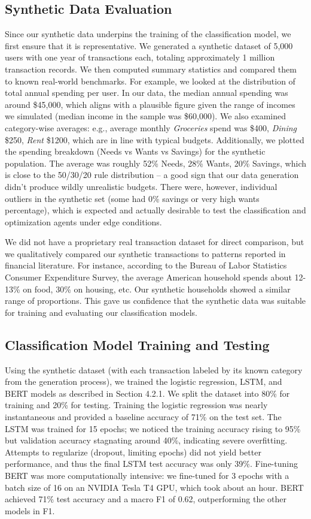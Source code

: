 \documentclass{scrartcl}
\begin{document}
\subsection{Synthetic Data Evaluation}
Since our synthetic data underpins the training of the classification model, we first ensure that it is representative. We generated a synthetic dataset of 5,000 users with one year of transactions each, totaling approximately 1 million transaction records. We then computed summary statistics and compared them to known real-world benchmarks. For example, we looked at the distribution of total annual spending per user. In our data, the median annual spending was around \$45,000, which aligns with a plausible figure given the range of incomes we simulated (median income in the sample was \$60,000). We also examined category-wise averages: e.g., average monthly \textit{Groceries} spend was \$400, \textit{Dining} \$250, \textit{Rent} \$1200, which are in line with typical budgets. Additionally, we plotted the spending breakdown (Needs vs Wants vs Savings) for the synthetic population. The average was roughly 52\% Needs, 28\% Wants, 20\% Savings, which is close to the 50/30/20 rule distribution – a good sign that our data generation didn't produce wildly unrealistic budgets. There were, however, individual outliers in the synthetic set (some had 0\% savings or very high wants percentage), which is expected and actually desirable to test the classification and optimization agents under edge conditions.

We did not have a proprietary real transaction dataset for direct comparison, but we qualitatively compared our synthetic transactions to patterns reported in financial literature. For instance, according to the Bureau of Labor Statistics Consumer Expenditure Survey, the average American household spends about 12-13\% on food, 30\% on housing, etc. Our synthetic households showed a similar range of proportions. This gave us confidence that the synthetic data was suitable for training and evaluating our classification models.

\subsection{Classification Model Training and Testing}
Using the synthetic dataset (with each transaction labeled by its known category from the generation process), we trained the logistic regression, LSTM, and BERT models as described in Section 4.2.1. We split the dataset into 80\% for training and 20\% for testing. Training the logistic regression was nearly instantaneous and provided a baseline accuracy of 71\% on the test set. The LSTM was trained for 15 epochs; we noticed the training accuracy rising to 95\% but validation accuracy stagnating around 40\%, indicating severe overfitting. Attempts to regularize (dropout, limiting epochs) did not yield better performance, and thus the final LSTM test accuracy was only 39\%. Fine-tuning BERT was more computationally intensive: we fine-tuned for 3 epochs with a batch size of 16 on an NVIDIA Tesla T4 GPU, which took about an hour. BERT achieved 71\% test accuracy and a macro F1 of 0.62, outperforming the other models in F1. 
\end{document}
